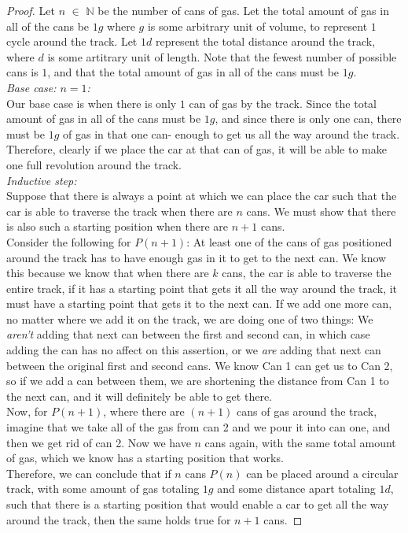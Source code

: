 \documentclass[12pt]{article}
\begin{document}
\begin{proof}
\bigskip
Let $n$ $\in$ $\mathbb{N}$ be the number of cans of gas. Let the total amount of gas in all of the cans be $1g$ where $g$ is some arbitrary unit of volume, to represent $1$ cycle around the track. Let $1d$ represent the total distance around the track, where $d$ is some artitrary unit of length. Note that the fewest number of possible cans is $1$, and that the total amount of gas in all of the cans must be $1g$. \\

\textit{Base case: $n = 1$:} \\

Our base case is when there is only $1$ can of gas by the track. Since the total amount of gas in all of the cans must be $1g$, and since there is only one can, there must be $1g$ of gas in that one can- enough to get us all the way around the track. Therefore, clearly if we place the car at that can of gas, it will be able to make one full revolution around the track.\\

\textit{Inductive step:} \\

Suppose that there is always a point at which we can place the car such that the car is able to traverse the track when there are $n$ cans. We must show that there is also such a starting position when there are $n + 1$ cans. \\

Consider the following for $P(n + 1)$: At least one of the cans of gas positioned around the track has to have enough gas in it to get to the next can. We know this because we know that when there are $k$ cans, the car is able to traverse the entire track, if it has a starting point that gets it all the way around the track, it must have a starting point that gets it to the next can. If we add one more can, no matter where we add it on the track, we are doing one of two things: We \textit{aren't} adding that next can between the first and second can, in which case adding the can has no affect on this assertion, or we \textit{are} adding that next can between the original first and second cans. We know Can 1 can get us to Can 2, so if we add a can between them, we are shortening the distance from Can 1 to the next can, and it will definitely be able to get there. \\

Now, for $P(n + 1)$, where there are $(n + 1)$ cans of gas around the track, imagine that we take all of the gas from can 2 and we pour it into can one, and then we get rid of can 2. Now we have $n$ cans again, with the same total amount of gas, which we know has a starting position that works. \\

Therefore, we can conclude that if $n$ cans $P(n)$ can be placed around a circular track, with some amount of gas totaling $1g$ and some distance apart totaling $1d$, such that there is a starting position that would enable a car to get all the way around the track, then the same holds true for $n + 1$ cans. 


\end{proof}
\end{document}
